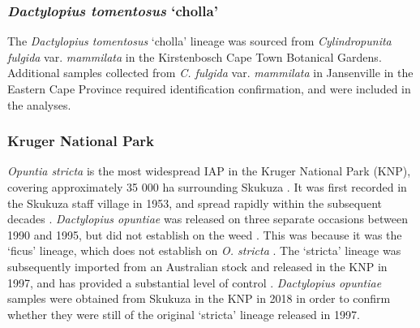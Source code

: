 \subsubsection{\textit{Dactylopius tomentosus} `cholla'} 
The \textit{Dactylopius tomentosus} `cholla' lineage was sourced from \textit{Cylindropunita fulgida} var. \textit{mammilata} in the Kirstenbosch Cape Town Botanical Gardens. Additional samples collected from \textit{C. fulgida} var. \textit{mammilata} in Jansenville in the Eastern Cape Province required identification confirmation, and were included in the analyses. 

\subsubsection{Kruger National Park}
\textit{Opuntia stricta} is the most widespread IAP in the Kruger National Park (KNP), covering approximately 35 000 ha surrounding Skukuza \citep{lotter1998integrated, foxcroft2004reconstructing}. It was first recorded in the Skukuza staff village in 1953, and spread rapidly within the subsequent decades \citep{lotter1998integrated}.
\textit{Dactylopius opuntiae} was released on three separate occasions between 1990 and 1995, but did not establish on the weed \citep{lotter1998integrated, foxcroft2000dispersal}. This was because it was the `ficus' lineage, which does not establish on \textit{O. stricta} \citep{Volchansky1999}. The `stricta' lineage was subsequently imported from an Australian stock and released in the KNP in 1997, and has provided a substantial level of control \citep{lotter1998integrated, foxcroft2000dispersal}.
\textit{Dactylopius opuntiae} samples were obtained from Skukuza in the KNP in 2018 in order to confirm whether they were still of the original `stricta' lineage released in 1997. 

